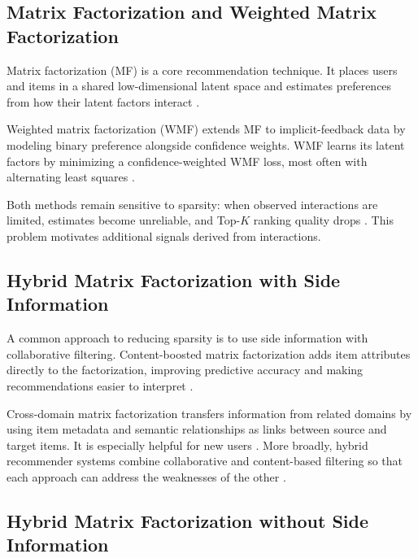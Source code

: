 \documentclass[pdflatex,sn-vancouver-num]{sn-jnl}%
\theoremstyle{thmstyleone}%
\theoremstyle{thmstyletwo}%
\theoremstyle{thmstylethree}%
\begin{document}
\subsection{Matrix Factorization and Weighted Matrix Factorization}

Matrix factorization (MF) is a core recommendation technique. It places users and items in a shared low-dimensional latent space and estimates preferences from how their latent factors interact \cite{koren2009mf}.

Weighted matrix factorization (WMF) extends MF to implicit-feedback data by modeling binary preference alongside confidence weights. WMF learns its latent factors by minimizing a confidence-weighted WMF loss, most often with alternating least squares \cite{hu2008implicit}.

Both methods remain sensitive to sparsity: when observed interactions are limited, estimates become unreliable, and Top-$K$ ranking quality drops \cite{roy2022systematic}. This problem motivates additional signals derived from interactions.

\subsection{Hybrid Matrix Factorization with Side Information}

A common approach to reducing sparsity is to use side information with collaborative filtering. Content-boosted matrix factorization adds item attributes directly to the factorization, improving predictive accuracy and making recommendations easier to interpret \cite{nguyen2013contentBoostedMF}.

Cross-domain matrix factorization transfers information from related domains by using item metadata and semantic relationships as links between source and target items. It is especially helpful for new users \cite{fernandezTobias2019crossDomainColdStart}. More broadly, hybrid recommender systems combine collaborative and content-based filtering so that each approach can address the weaknesses of the other \cite{parthasarathy2023hybrid}.

\subsection{Hybrid Matrix Factorization without Side Information}
\end{document}
